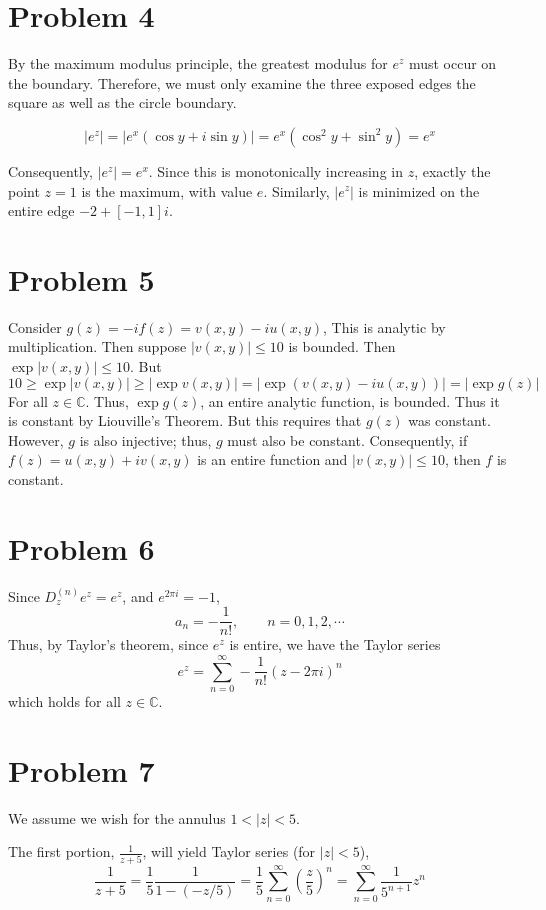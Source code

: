\documentclass{article}
\theoremstyle{definition}
\newcommand{\Co}{\mathbb{C}}
\newcommand{\p}[1]{\left(#1\right)}
\newcommand{\abs}[1]{\left|#1\right|}
\begin{document}
\section{Problem 4}
By the maximum modulus principle, the greatest modulus for $e^z$ must
occur on the boundary. Therefore, we must only examine the three exposed edges 
the square as well as the circle boundary.

\[ 
\abs{e^z} 
= \abs{e^x(\cos y + i \sin y)}
= e^x (\cos^2 y + \sin^2 y)
= e^x
\]

Consequently, $\abs{e^z}=e^x$. Since this is monotonically increasing in $z$, 
exactly the point $z=1$ is the maximum, with value
$e$. Similarly, $\abs{e^z}$ is minimized on the entire edge $-2+[-1,1]i$.

\section{Problem 5}
Consider $g(z)=-if(z)=v(x,y) - iu(x,y)$, This is analytic by multiplication. Then 
suppose $\abs{v(x,y)} \le 10$ is bounded. Then $\exp \abs{v(x,y)} \le 10$.
But 
\[ 
10 
\ge \exp\abs{v(x,y)}
\ge \abs{\exp v(x,y)}
= \abs{\exp\p{v(x,y) - i u(x,y)}}
= \abs{\exp g(z)}
\]
For all $z \in \Co$. Thus, $\exp g(z)$, an entire analytic function, is bounded.
Thus it is constant by Liouville's Theorem. But this requires that $g(z)$ was
constant. However, $g$ is also injective; thus, 
$g$ must also be constant. Consequently, if $f(z) = u(x,y)+iv(x,y)$ is an entire
function and $\abs{v(x,y)} \le 10$, then $f$ is constant.

\section{Problem 6}
Since $D_z^{(n)} e^z = e^z$, and $e^{2 \pi i}=-1$, 
\[ a_n=-\frac{1}{n!}, \qquad n=0,1,2,\cdots \]
Thus, by Taylor's theorem, since $e^z$ is entire, we have the Taylor series
\[
e^z = \sum_{n=0}^\infty -\frac{1}{n!} (z-2 \pi i)^n
\]
which holds for all $z \in \Co$.

\section{Problem 7}
We assume we wish for the annulus $1 < \abs{z} < 5$.

The first portion, $\frac{1}{z+5}$, will yield Taylor series
(for $\abs{z}<5$),
\[ 
\frac{1}{z+5} 
= \frac{1}{5} \frac{1}{1 -(- z/5)}
= \frac{1}{5} \sum_{n=0}^\infty \p{\frac{z}{5}}^n
= \sum_{n=0}^\infty \frac{1}{5^{n+1}} z^n
\]
\end{document}
